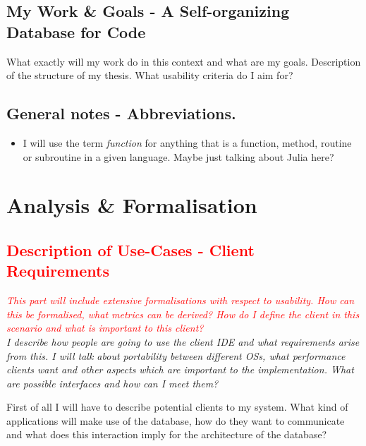 \documentclass[11p]{scrartcl}
\begin{document}
\subsection{My Work \& Goals - A Self-organizing Database for Code}
What exactly will my work do in this context and what are my goals. 
Description of the structure of my thesis. What usability criteria do I aim for?\\

\subsection*{General notes - Abbreviations.}
\begin{itemize}
	\item I will use the term \textit{function} for anything that is a function, method, routine or subroutine in a given language. Maybe just talking about Julia here?
\end{itemize}



\section{Analysis \& Formalisation}
\label{sec:analysis}

\subsection{\textcolor{red}{Description of Use-Cases - Client Requirements}}
\label{sec:clientReq}
\textit{\textcolor{red}{This part will include extensive formalisations with respect to usability. How can this be formalised, what metrics can be derived? How do I define the client in this scenario and what is important to this client?}\\
I describe how people are going to use the client IDE and what requirements arise from this. I will talk about portability between different OSs, what performance clients want and other aspects which are important to the implementation. What are possible interfaces and how can I meet them?}

First of all I will have to describe potential clients to my system. What kind of applications will make use of the database, how do they want to communicate and what does this interaction imply for the architecture of the database?
\end{document}
